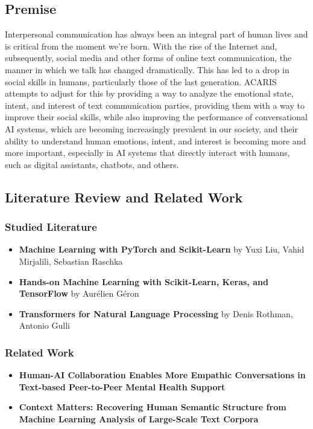 \documentclass{article}
\begin{document}
\subsection{Premise}
Interpersonal communication has always been an integral part of human lives and is critical from the moment we're born. With the rise of the Internet and, subsequently, social media and other forms of online text communication, the manner in which we talk has changed dramatically. This has led to a drop in social skills in humans, particularly those of the last generation. ACARIS attempts to adjust for this by providing a way to analyze the emotional state, intent, and interest of text communication parties, providing them with a way to improve their social skills, while also improving the performance of conversational AI systems, which are becoming increasingly prevalent in our society, and their ability to understand human emotions, intent, and interest is becoming more and more important, especially in AI systems that directly interact with humans, such as digital assistants, chatbots, and others.

\subsection{Literature Review and Related Work}
\subsubsection{Studied Literature}
\begin{itemize}
	\item \textbf{Machine Learning with PyTorch and Scikit-Learn}\cite{raschka2022machine} by Yuxi Liu, Vahid Mirjalili, Sebastian Raschka
	\item \textbf{Hands-on Machine Learning with Scikit-Learn, Keras, and TensorFlow}\cite{geron2022hands} by Aurélien Géron
	\item \textbf{Transformers for Natural Language Processing}\cite{rothman2022transformers} by Denis Rothman, Antonio Gulli
\end{itemize}
\subsubsection{Related Work}
\begin{itemize}
	\item \textbf{Human-AI Collaboration Enables More Empathic Conversations in Text-based Peer-to-Peer Mental Health Support}\cite{sharma2022humanai}
	\item \textbf{Context Matters: Recovering Human Semantic Structure from Machine Learning Analysis of Large-Scale Text Corpora}\cite{https://doi.org/10.1111/cogs.13085}
\end{itemize}
\end{document}
